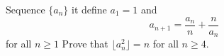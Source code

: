 Sequence $\{a_n\}$ it define $a_1=1$ and
\[a_{n+1}=\frac{a_n}{n}+\frac{n}{a_n}\]for all $n\ge 1$
Prove that $\lfloor a_n^2\rfloor=n$ for all $n\ge 4.$